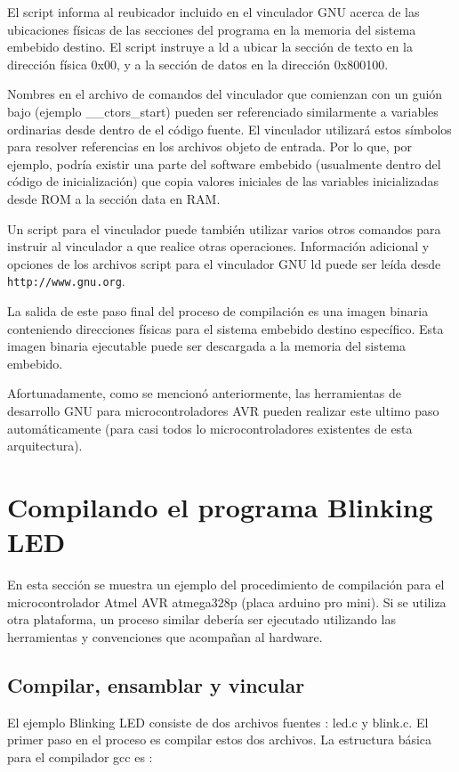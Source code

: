 \documentclass[output=paper, 
colorlinks,
citecolor=brown,
newtxmath
]{langscibook}
\begin{document}
El script informa al reubicador incluido en el vinculador GNU acerca de las ubicaciones
físicas de las secciones del programa en la memoria del sistema embebido destino.
El script instruye a ld a ubicar la sección de texto en la dirección física 0x00,
y a la sección de datos en la dirección 0x800100.

Nombres en el archivo de comandos del vinculador que comienzan con un guión bajo
(ejemplo \_\_ctors\_start) pueden ser referenciado similarmente a variables ordinarias
desde dentro de el código fuente. El vinculador utilizará estos símbolos
para resolver referencias en los archivos objeto de entrada.
Por lo que, por ejemplo, podría existir una parte del software embebido (usualmente
dentro del código de inicialización) que copia valores iniciales de las variables
inicializadas desde ROM a la sección data en RAM.

Un script para el vinculador puede también utilizar varios otros comandos
para instruir al vinculador a que realice otras operaciones.
Información adicional y opciones de los archivos script para el vinculador GNU ld
puede ser leída desde \texttt{http://www.gnu.org}.

La salida de este paso final del proceso de compilación es una imagen binaria
conteniendo direcciones físicas para el sistema embebido destino específico.
Esta imagen binaria ejecutable puede ser descargada a la memoria del sistema embebido.

Afortunadamente, como se mencionó anteriormente, las herramientas de desarrollo
GNU para microcontroladores AVR pueden realizar este ultimo paso automáticamente
(para casi todos lo microcontroladores existentes de esta arquitectura).

\section {Compilando el programa Blinking LED}

En esta sección se muestra un ejemplo del procedimiento de compilación 
para el microcontrolador Atmel AVR atmega328p (placa arduino pro mini).
Si se utiliza otra plataforma, un proceso similar debería ser ejecutado
utilizando las herramientas y convenciones que acompañan al hardware.

\subsection {Compilar, ensamblar y vincular}

El ejemplo Blinking LED consiste de dos archivos fuentes : led.c y blink.c.
El primer paso en el proceso es compilar estos dos archivos.
La estructura básica para el compilador gcc es :
\end{document}
